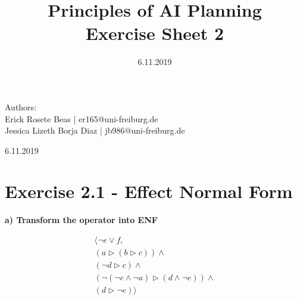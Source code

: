 \documentclass[12pt,a4paper]{article}
\title{\textbf{Principles of AI Planning
		\\{\Large Exercise Sheet 2}}}
\date{6.11.2019}
\begin{document}
	\begin{flushleft}
		Authors:\\
		Erick Rosete Beas | er165@uni-freiburg.de\\
		Jessica Lizeth Borja Diaz | jb986@uni-freiburg.de\\
	\end{flushleft}
	{\let\newpage\relax\maketitle}
	\begin{center} 
		\large 6.11.2019 
	\end{center}

	\section*{Exercise 2.1 - Effect Normal Form}
	\textbf{a) Transform the operator into ENF}
	
	\begin{align*} 
		\langle\neg e \lor f,
		\\ (a \triangleright (b \triangleright c)) \land
		\\ (\neg d \triangleright c) \land
		\\ (\neg(\neg c \land \neg a) \triangleright (d \land \neg e)) \land 
		\\ (d \triangleright \neg e) \rangle 
	\end{align*} 
\end{document}

